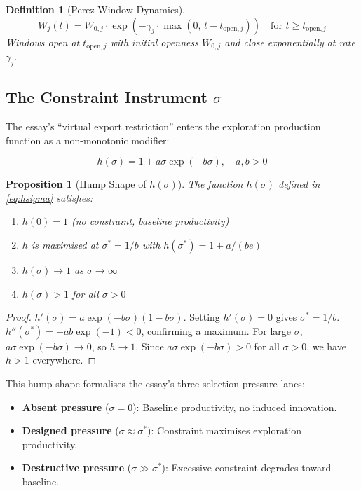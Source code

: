 \documentclass[11pt,a4paper]{article}
\newtheorem{proposition}{Proposition}
\newtheorem{definition}{Definition}
\theoremstyle{remark}
\begin{document}
\begin{definition}[Perez Window Dynamics]
\begin{equation}
W_j(t) = W_{0,j} \cdot \exp\left(-\gamma_j \cdot \max(0,\, t - t_{\text{open},j})\right) \quad \text{for } t \geq t_{\text{open},j}
\label{eq:window}
\end{equation}
Windows open at $t_{\text{open},j}$ with initial openness $W_{0,j}$ and close exponentially at rate $\gamma_j$.
\end{definition}

\subsection{The Constraint Instrument $\sigma$}

The essay's ``virtual export restriction'' enters the exploration production function as a non-monotonic modifier:

\begin{equation}
h(\sigma) = 1 + a\sigma \exp(-b\sigma), \quad a, b > 0
\label{eq:hsigma}
\end{equation}

\begin{proposition}[Hump Shape of $h(\sigma)$]
\label{prop:hump}
The function $h(\sigma)$ defined in \eqref{eq:hsigma} satisfies:
\begin{enumerate}
    \item $h(0) = 1$ (no constraint, baseline productivity)
    \item $h$ is maximised at $\sigma^* = 1/b$ with $h(\sigma^*) = 1 + a/(be)$
    \item $h(\sigma) \to 1$ as $\sigma \to \infty$
    \item $h(\sigma) > 1$ for all $\sigma > 0$
\end{enumerate}
\end{proposition}

\begin{proof}
$h'(\sigma) = a\exp(-b\sigma)(1 - b\sigma)$. Setting $h'(\sigma) = 0$ gives $\sigma^* = 1/b$. $h''(\sigma^*) = -ab\exp(-1) < 0$, confirming a maximum. For large $\sigma$, $a\sigma\exp(-b\sigma) \to 0$, so $h \to 1$. Since $a\sigma\exp(-b\sigma) > 0$ for all $\sigma > 0$, we have $h > 1$ everywhere.
\end{proof}

This hump shape formalises the essay's three selection pressure lanes:
\begin{itemize}
    \item \textbf{Absent pressure} ($\sigma = 0$): Baseline productivity, no induced innovation.
    \item \textbf{Designed pressure} ($\sigma \approx \sigma^*$): Constraint maximises exploration productivity.
    \item \textbf{Destructive pressure} ($\sigma \gg \sigma^*$): Excessive constraint degrades toward baseline.
\end{itemize}
\end{document}
